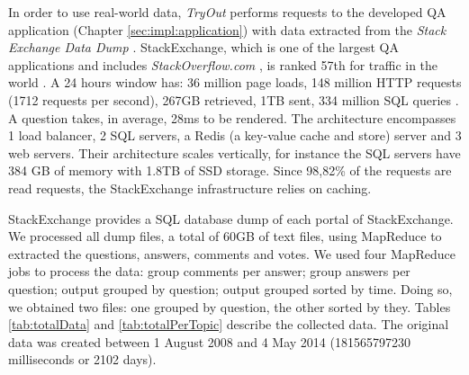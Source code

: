 In order to use real-world data, \emph{TryOut} performs requests to the developed \acf{QA} application (Chapter \ref{sec:impl:application}) with data extracted from the \textit{Stack Exchange Data Dump} \cite{stackexchange_data}. StackExchange, which is one of the largest \ac{QA} applications and includes \textit{StackOverflow.com} \cite{stackoverflow}, is ranked 57th for traffic in the world \cite{websiteRanking}. A 24 hours window has: 36 million page loads, 148 million \ac{HTTP} requests (1712 requests per second), 267GB retrieved, 1TB sent, 334 million \ac{SQL} queries \cite{stackStatistics}. A question takes, in average, 28ms to be rendered. The architecture encompasses 1 load balancer, 2 \ac{SQL} servers, a Redis \cite{redis} (a key-value cache and store) server and 3 web servers. Their architecture scales vertically, for instance the \ac{SQL} servers have 384 GB of memory with 1.8TB of SSD storage. Since 98,82\% of the requests are read requests, the StackExchange infrastructure relies on caching.

StackExchange provides a \ac{SQL} database dump of each portal of StackExchange. We processed all dump files, a total of 60GB of text files, using MapReduce \cite{mapreduce} to extracted the questions, answers, comments and votes. We used four MapReduce jobs to process the data: group comments per answer; group answers per question; output grouped by question; output grouped sorted by time. Doing so, we obtained two files: one grouped by question, the other sorted by they. Tables \ref{tab:totalData} and \ref{tab:totalPerTopic} describe the collected data. The original data was created between 1 August 2008 and 4 May 2014 (181565797230 milliseconds or 2102 days). 

